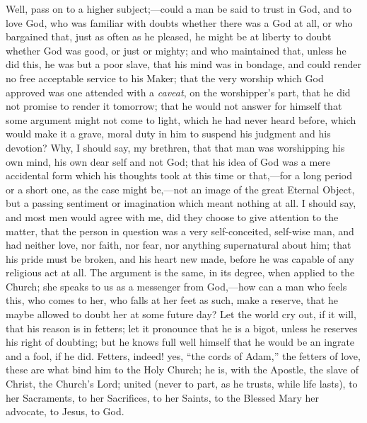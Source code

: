 Well, pass on to a higher subject;—could a man be said to trust
in God, and to love God, who was familiar with doubts whether there
was a God at all, or who bargained that, just as often as he pleased,
he might be at liberty to doubt whether God was good, or just or
mighty; and who maintained that, unless he did this, he was but a poor
slave, that his mind was in bondage, and could render no free
acceptable service to his Maker; that the very worship which God
approved was one attended with a \emph{caveat}, on the worshipper's
part, that he did not promise to render it tomorrow; that he would not
answer for himself that some argument might not come to light, which
he had never heard before, which would make it a grave, moral duty in
him to suspend his judgment and his devotion? Why, I should say, my
brethren, that that man was worshipping his own mind, his own dear
self and not God; that his idea of God was a mere accidental form
which his thoughts took at this time or that,—for a long period or a
short one, as the case might be,—not an image of the great Eternal
Object, but a passing sentiment or imagination which meant nothing at
all. I should say, and most men would agree with me, did they choose
to give attention to the matter, that the person in question was a
very self-conceited, self-wise man, and had neither love, nor faith,
nor fear, nor anything supernatural about him; that his pride must be
broken, and his heart new made, before he was capable of any religious
act at all. The argument is the same, in its degree, when applied to
the Church; she speaks to us as a messenger from God,—how can a man
who feels this, who comes to her, who falls at her feet as such, make
a reserve, that he maybe allowed to doubt her at some future day? Let
the world cry out, if it will, that his reason is in fetters; let it
pronounce that he is a bigot, unless he reserves his right of
doubting; but he knows full well himself that he would be an ingrate
and a fool, if he did. Fetters, indeed! yes, ``the cords of
Adam,'' the fetters of love, these are what bind him to the Holy
Church; he is, with the Apostle, the slave of Christ, the Church's
Lord; united (never to part, as he trusts, while life lasts), to her
Sacraments, to her Sacrifices, to her Saints, to the Blessed Mary her
advocate, to Jesus, to God.

